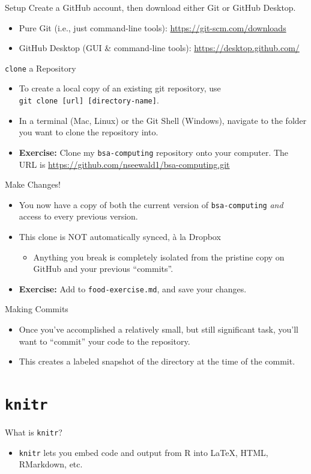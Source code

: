 \documentclass{beamer}
\begin{document}
	\begin{frame}{Setup}
		Create a GitHub account, then download either Git or GitHub Desktop.
		\begin{itemize}
			\item Pure Git (i.e., just command-line tools): \url{https://git-scm.com/downloads}
			\item GitHub Desktop (GUI \& command-line tools): \url{https://desktop.github.com/}
		\end{itemize}
	\end{frame}
	
	\begin{frame}{\texttt{clone} a Repository}
		\begin{itemize}
			\item To create a local copy of an existing git repository, use 
			\\ \texttt{git clone [url] [directory-name]}.
			\item In a terminal (Mac, Linux) or the Git Shell (Windows), navigate to the folder you want to clone the repository into.
			\item \textbf{Exercise:} Clone my \texttt{bsa-computing} repository onto your computer. The URL is \url{https://github.com/nseewald1/bsa-computing.git}
		\end{itemize}
	\end{frame}
	
	\begin{frame}{Make Changes!}
		\begin{itemize}
			\item You now have a copy of both the current version of \texttt{bsa-computing} \textit{and} access to every previous version.
			\item This clone is NOT automatically synced, \`a la Dropbox
			\begin{itemize}
				\item Anything you break is completely isolated from the pristine copy on GitHub and your previous ``commits''.
			\end{itemize}
			\item \textbf{Exercise:} Add to \texttt{food-exercise.md}, and save your changes.
		\end{itemize}
	\end{frame}
	
	\begin{frame}{Making Commits}
		\begin{itemize}
			\item Once you've accomplished a relatively small, but still significant task, you'll want to ``commit'' your code to the repository.
			\item This creates a labeled snapshot of the directory at the time of the commit.
		\end{itemize}
	\end{frame}
	
	\section{\texttt{knitr}}
	
	\begin{frame}{What is \texttt{knitr}?}
		\begin{itemize}
			\item \texttt{knitr} lets you embed code and output from R into \LaTeX, HTML, RMarkdown, etc.
		\end{itemize}
	\end{frame}
	
\end{document}

